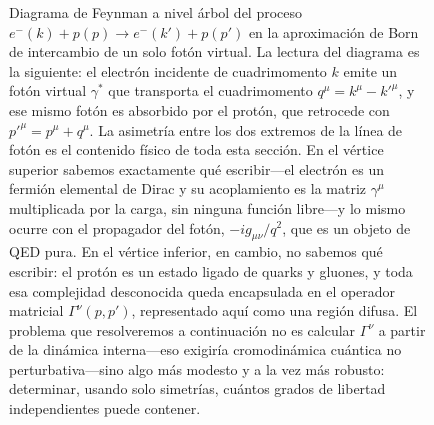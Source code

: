 \documentclass[10pt,a4paper]{article}
\begin{document}
\begin{figure}[t]
\caption{Diagrama de Feynman a nivel árbol del proceso $e^-(k) + p(p) \to e^-(k') + p(p')$ en la aproximación de Born de intercambio de un solo fotón virtual. La lectura del diagrama es la siguiente: el electrón incidente de cuadrimomento $k$ emite un fotón virtual $\gamma^*$ que transporta el cuadrimomento $q^\mu = k^\mu - k'^\mu$, y ese mismo fotón es absorbido por el protón, que retrocede con $p'^\mu = p^\mu + q^\mu$. La asimetría entre los dos extremos de la línea de fotón es el contenido físico de toda esta sección. En el vértice superior sabemos exactamente qué escribir---el electrón es un fermión elemental de Dirac y su acoplamiento es la matriz $\gamma^\mu$ multiplicada por la carga, sin ninguna función libre---y lo mismo ocurre con el propagador del fotón, $-ig_{\mu\nu}/q^2$, que es un objeto de QED pura. En el vértice inferior, en cambio, no sabemos qué escribir: el protón es un estado ligado de quarks y gluones, y toda esa complejidad desconocida queda encapsulada en el operador matricial $\Gamma^\nu(p,p')$, representado aquí como una región difusa. El problema que resolveremos a continuación no es calcular $\Gamma^\nu$ a partir de la dinámica interna---eso exigiría cromodinámica cuántica no perturbativa---sino algo más modesto y a la vez más robusto: determinar, usando solo simetrías, cuántos grados de libertad independientes puede contener.}
\label{fig:feynman_tree}
\end{figure}
\end{document}
